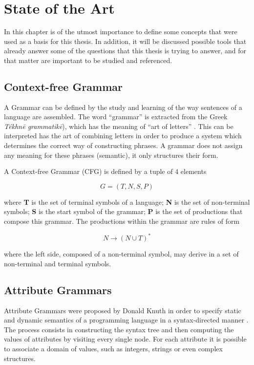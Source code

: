 \chapter{State of the Art} \label{state_of_the_art}

In this chapter is of the utmost importance to define some concepts that were used as a basis for this thesis. 
In addition, it will be discussed possible tools that already answer some of the questions that this thesis is trying to answer, and for that matter are important to be studied and referenced.
	

\section{Context-free Grammar}

A Grammar can be defined by the study and learning of the way sentences of a language are assembled.
The word ``grammar'' is extracted from the Greek \emph{Tékhnē grammatikē}), which has the meaning of ``art of letters'' \cite{britannica_2020}.
This can be interpreted has the art of combining letters in order to produce a system which determines the correct way of constructing phrases.
A grammar does not assign any meaning for these phrases (semantic), it only structures their form.

A Context-free Grammar (\textsc{CFG}) is defined by a tuple of 4 elements \cite{henriques_2011}

\[ G = (T, N, S, P) \]

\noindent where \textbf{T} is the set of terminal symbols of a language;
\textbf{N} is the set of non-terminal symbols;
\textbf{S} is the start symbol of the grammar;
\textbf{P} is the set of productions that compose this grammar.
The productions within the grammar are rules of form

\[ N \rightarrow (N \cup T)^* \]

\noindent where the left side, composed of a non-terminal symbol, may derive in a set of non-terminal and terminal symbols.


\section{Attribute Grammars}
Attribute Grammars were proposed by Donald Knuth in order to specify static and dynamic semantics of a programming language in a syntax-directed manner \cite{thirunarayan_2009}. 
The process consists in constructing the syntax tree and then computing the values of attributes by visiting every single node. 
For each attribute it is possible to associate a domain of values, such as integers, strings or even complex structures. 

